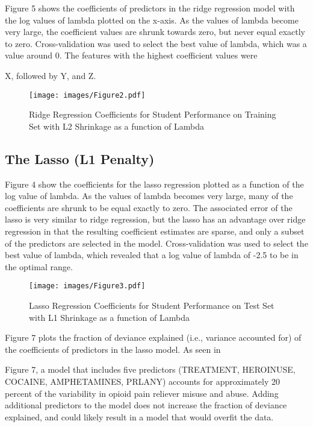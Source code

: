 \documentclass[sigconf]{acmart}
\begin{document}
Figure 5 shows the coefficients of predictors in the ridge regression model 
with the log values of lambda plotted on the x-axis. As the values of lambda 
become very large, the coefficient values are shrunk towards zero, but 
never equal exactly to zero. Cross-validation was used to select the best 
value of lambda, which was a value around 0. The features with the highest 
coefficient values were 

X, followed by Y, and Z. 

\begin{figure}[!ht]
  \centering\texttt{[image: images/Figure2.pdf]}
  \caption{Ridge Regression Coefficients for Student Performance on Training Set
  with L2 Shrinkage as a function of Lambda}
  \label{f:Figure2}
\end{figure}



\subsection{The Lasso (L1 Penalty)}

Figure 4 show the coefficients for the lasso regression plotted as a function 
of the log value of lambda. As the values of lambda becomes very large, many of 
the  coefficients are shrunk to be equal exactly to zero. The associated error 
of the lasso is very similar to ridge regression, but the lasso has an 
advantage over ridge regression in that the resulting coefficient estimates 
are sparse, and only a subset of the predictors are selected in the model. 
Cross-validation was used to select the best value of lambda, which 
revealed that a log value of lambda of -2.5 to be in the optimal range.


\begin{figure}[!ht]
  \centering\texttt{[image: images/Figure3.pdf]}
  \caption{Lasso Regression Coefficients for Student Performance on Test Set 
  with L1 Shrinkage as a function of Lambda}
  \label{f:Figure3}
\end{figure}

Figure 7 plots the fraction of deviance explained (i.e., variance accounted 
for) of the coefficients of predictors in the lasso model. As seen in 

Figure 7, a model that includes five predictors (TREATMENT, HEROINUSE, 
COCAINE, AMPHETAMINES, PRLANY) accounts for approximately 20 percent of the 
variability in opioid pain reliever misuse and abuse. Adding additional 
predictors to the model does not increase the fraction of deviance explained, 
and could likely result in a model that would overfit the data. 
\end{document}
